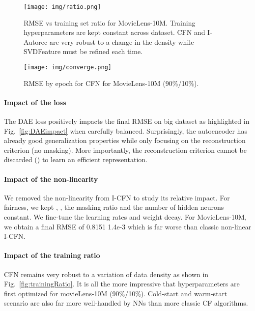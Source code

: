 \documentclass{article}
\begin{document}
\begin{figure*}[t]
\centering
\begin{minipage}{.60\textwidth}
	\centering
	\texttt{[image: img/ratio.png]}
	\caption{RMSE vs training set ratio for MovieLens-10M. Training hyperparameters are kept constant across dataset. CFN and I-Autorec are very robust to a change in the density while SVDFeature must be refined each time.}
	\label{fig:trainingRatio}
\end{minipage}
\quad
\begin{minipage}{.35\textwidth}
    \centering
    \texttt{[image: img/converge.png]}
    \caption{RMSE by epoch for CFN for MovieLens-10M (90\%/10\%). 
    }
    \label{fig:converge}
\end{minipage}
\end{figure*}

\vspace{-0.5em}
\paragraph{Impact of the loss}
The DAE loss positively impacts the final RMSE on big dataset as highlighted in Fig.~\ref{fig:DAEimpact} when carefully balanced. Surprisingly, the autoencoder has already good generalization properties while only focusing on the reconstruction criterion (no masking). More importantly, the reconstruction criterion cannot be discarded  () to learn an efficient representation. \vspace{-0.5em}
\paragraph{Impact of the non-linearity}
We removed the non-linearity from I-CFN to study its relative impact. For fairness, we kept , , the masking ratio and the number of hidden neurons constant. We fine-tune the learning rates and weight decay. For MovieLens-10M, we obtain a final RMSE of 0.8151  1.4e-3 which is far worse than classic non-linear I-CFN. 
\vspace{-0.5em}
\paragraph{Impact of the training ratio}
CFN remains very robust to a variation of data density as shown in Fig.~\ref{fig:trainingRatio}. It is all the more impressive that hyperparameters are first optimized for movieLens-10M (90\%/10\%). Cold-start and warm-start scenario are also far more well-handled by NNs than more classic CF algorithms. 
\end{document}
